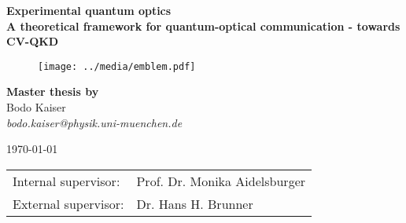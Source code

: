 \makeatletter
\begin{titlepage}
	\begin{center}
		\large
		    \textbf{\textsf{Experimental quantum optics}}\\
	    \vspace{0.8em}
		\huge
	    \textbf{\textsf{A theoretical framework for quantum-optical communication - towards CV-QKD}}\\
		
		\vspace{1.2em}
		\begin{figure}[htb]
			\centering
			\texttt{[image: ../media/emblem.pdf]}
		\end{figure}
		
		\vspace{.6em}
	    \large
	    \textbf{Master thesis by}\\
		\vspace{.8em}
	    \large
		Bodo Kaiser\\
	    \vspace{.2em}
		\textit{bodo.kaiser@physik.uni-muenchen.de}

	    \large
	    \today

	    \vspace{1.9em}
		\normalsize
		\begin{tabular}{ll}
		Internal supervisor: & Prof. Dr. Monika Aidelsburger \\
		External supervisor: & Dr. Hans H. Brunner \\
		\end{tabular}
	\end{center}
\end{titlepage}
\makeatother
